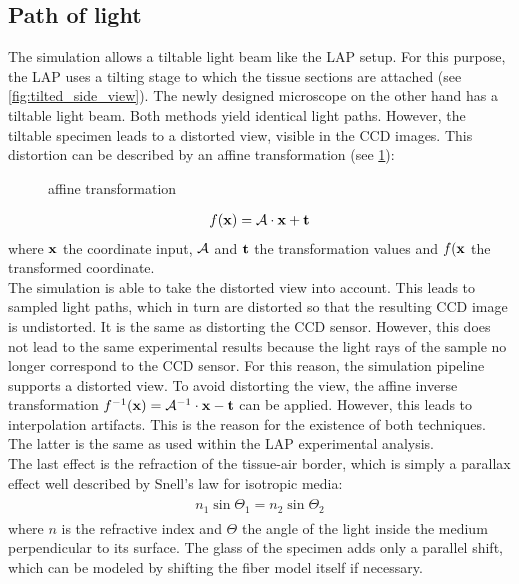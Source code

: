 \subsection{Path of light}
The simulation allows a tiltable light beam like the \ac{LAP} setup.
For this purpose, the \ac{LAP} uses a tilting stage to which the tissue sections are attached (see \cref{fig:tilted_side_view}). 
The newly designed microscope on the other hand has a tiltable light beam.
Both methods yield identical light paths.
However, the tiltable specimen leads to a distorted view, visible in the \ac{CCD} images.
This distortion can be described by an affine transformation (see \cref{fig::affine_transformation}):
% 
\begin{figure}[!t]
\centering

\caption{affine transformation}
\label{fig::affine_transformation}
\end{figure}
% 
\begin{align}
f(\mathbf{x}) = \mathcal{A} \cdot \mathbf{x} + \mathbf{t}
\end{align}
where $\mathbf{x}$ the coordinate input, $\mathcal{A}$ and $\mathbf{t}$ the transformation values and $f(\mathbf{x}$ the transformed coordinate.
\\
% 
The simulation is able to take the distorted view into account.
This leads to sampled light paths, which in turn are distorted so that the resulting \ac{CCD} image is undistorted.
It is the same as distorting the \ac{CCD} sensor.
However, this does not lead to the same experimental results because the light rays of the sample no longer correspond to the \ac{CCD} sensor.
For this reason, the simulation pipeline supports a distorted view.
To avoid distorting the view, the affine inverse transformation $f^{-1}(\mathbf{x}) = \mathcal{A}^{-1} \cdot \mathbf{x} - \mathbf{t}$ can be applied.
However, this leads to interpolation artifacts.
This is the reason for the existence of both techniques.
The latter is the same as used within the \ac{LAP} experimental analysis.
\\
% 
The last effect is the refraction of the tissue-air border, which is simply a parallax effect well described by Snell's law for isotropic media:
\begin{align}
\begin{split}
    n_1 \sin{\Theta_1} = n_2 \sin{\Theta_2}
\end{split}
\label{equ:snell}
\end{align}
where $n$ is the refractive index and $\Theta$ the angle of the light inside the medium perpendicular to its surface.
The glass of the specimen adds only a parallel shift, which can be modeled by shifting the fiber model itself if necessary.
